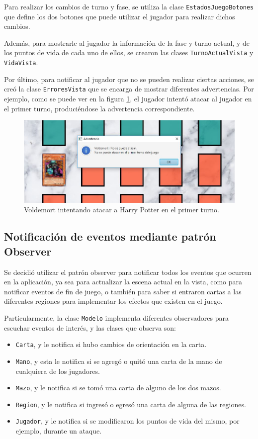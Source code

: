 	Para realizar los cambios de turno y fase, se utiliza la clase \texttt{EstadosJuegoBotones} que define los dos botones que puede utilizar el jugador para realizar dichos cambios.
	
	Además, para mostrarle al jugador la información de la fase y turno actual, y de los puntos de vida de cada uno de ellos, se crearon las clases \texttt{TurnoActualVista} y \texttt{VidaVista}.
	
	Por último, para notificar al jugador que no se pueden realizar ciertas acciones, se creó la clase \texttt{ErroresVista} que se encarga de mostrar diferentes advertencias. Por ejemplo, como se puede ver en la figura \ref{vista_errores_jugador}, el jugador  intentó atacar al jugador  en el primer turno, produciéndose la advertencia correspondiente.
	
	\begin{figure}[H]
		\centering
		\includegraphics[scale=0.7]{includes/vista_errores_jugador}
		\caption{Voldemort intentando atacar a Harry Potter en el primer turno.}
		\label{vista_errores_jugador}
	\end{figure}
	
	\subsection{Notificación de eventos mediante patrón Observer}
	
	Se decidió utilizar el patrón observer para notificar todos los eventos que ocurren en la aplicación, ya sea para actualizar la escena actual en la vista, como para notificar eventos de fin de juego, o también para saber si entraron cartas a las diferentes regiones para implementar los efectos que existen en el juego.
	
	Particularmente, la clase \texttt{Modelo} implementa diferentes observadores para escuchar eventos de interés, y las clases que observa son:
	\begin{itemize}
		\item \texttt{Carta}, y le notifica si hubo cambios de orientación en la carta.
		\item \texttt{Mano}, y esta le notifica si se agregó o quitó una carta de la mano de cualquiera de los jugadores.
		\item \texttt{Mazo}, y le notifica si se tomó una carta de alguno de los dos mazos.
		\item \texttt{Region}, y le notifica si ingresó o egresó una carta de alguna de las regiones.
		\item \texttt{Jugador}, y le notifica si se modificaron los puntos de vida del mismo, por ejemplo, durante un ataque.
	\end{itemize}
	
